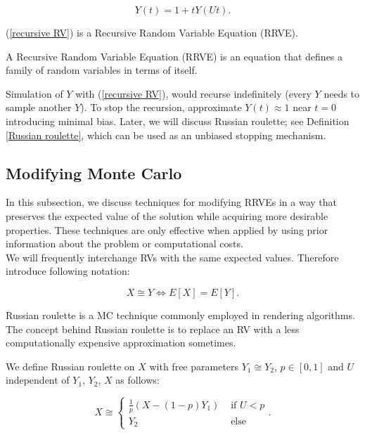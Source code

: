 \documentclass[a4paper,12pt]{article}
\begin{document}
\begin{equation} \label{recursive RV}
  Y(t) = 1 + t  Y(Ut).
\end{equation}


(\ref{recursive RV}) is a Recursive Random Variable
Equation (RRVE).

\begin{definition}
  A Recursive Random Variable Equation (RRVE) is
  an equation that defines a
  family of random variables in terms of itself.
\end{definition}

Simulation of $Y$ with (\ref{recursive RV}),
would recurse indefinitely (every $Y$ needs to sample another $Y$).
To stop the recursion, approximate
$Y(t) \approx 1$ near $t = 0$ introducing minimal bias.
Later, we will discuss Russian roulette; see Definition \ref{Russian roulette},
which can be used as an unbiased stopping mechanism.

\subsection{Modifying Monte Carlo}

In this subsection, we discuss techniques for modifying RRVEs
in a way that preserves the expected value of the solution while
acquiring more desirable properties. These techniques are only
effective when applied by using prior information
about the problem or computational costs. \\

We will frequently interchange RVs with the same expected values.
Therefore introduce following notation:
\begin{notation}[$\cong$]
  \[
    X \cong Y \iff E[X]=E[Y]
    .\]
\end{notation}

Russian roulette is a MC technique commonly employed in rendering algorithms.
The concept behind Russian roulette is to replace an RV with a
less computationally expensive approximation sometimes.

\begin{definition} \label{Russian roulette}
  We define Russian roulette on $X$ with free parameters
  $Y_{1} \cong Y_{2}$, $p \in [0,1]$
  and $U$ independent of $Y_{1}$, $Y_{2}$, $X$
  as follows:

  \begin{equation}
    X \cong
    \begin{cases}
      \frac{1}{p}(X - (1-p)Y_{1}) & \text{ if } U < p \\
      Y_{2}                       & \text{ else }
    \end{cases}.
  \end{equation}
\end{definition}
\end{document}
